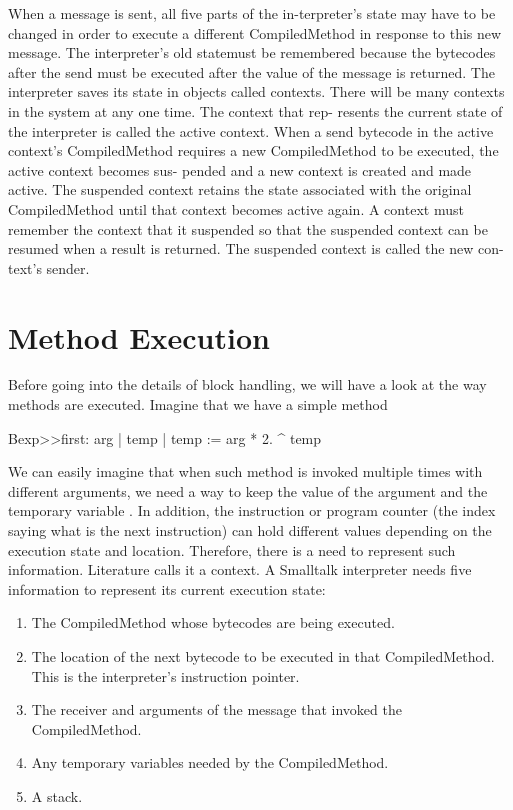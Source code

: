 \documentclass[a4paper,10pt,twoside]{book}
\begin{document}
When a message is sent, all five parts of the in-terpreter's state may have to be changed in order to execute a different CompiledMethod in response to this new message. The interpreter's old statemust be remembered because the bytecodes after the send must be executed after the value of the message is returned.
The interpreter saves its state in objects called contexts. There will be many contexts in the system at any one time. The context that rep- resents the current state of the interpreter is called the active context. When a send bytecode in the active context's CompiledMethod requires a new CompiledMethod to be executed, the active context becomes sus- pended and a new context is created and made active. The suspended context retains the state associated with the original CompiledMethod until that context becomes active again. A context must remember the context that it suspended so that the suspended context can be resumed when a result is returned. The suspended context is called the new con- text's sender.




\section{Method Execution}
Before going into the details of block handling, we will have a look at the way methods are executed. Imagine that we have 
a simple method 

\begin{code}{}
Bexp>>first: arg
	| temp | 	
	temp := arg * 2.
	^ temp
\end{code}

We can easily imagine that when such method is invoked multiple times with different arguments, we need a way to keep 
the value of the argument  and the temporary variable . In addition, the instruction or program counter (the index saying what is the next instruction) can hold different values depending on the execution state and location. Therefore, there is a need to represent such information. Literature calls it a context. A Smalltalk interpreter needs five information to represent its current execution state:
\begin{enumerate}
\item The CompiledMethod whose bytecodes are being executed.
\item The location of the next bytecode to be executed in that
CompiledMethod. This is the interpreter's instruction pointer.
\item The receiver and arguments of the message that invoked the
CompiledMethod.
\item Any temporary variables needed by the CompiledMethod.
\item A stack.
\end{enumerate}
\end{document}
